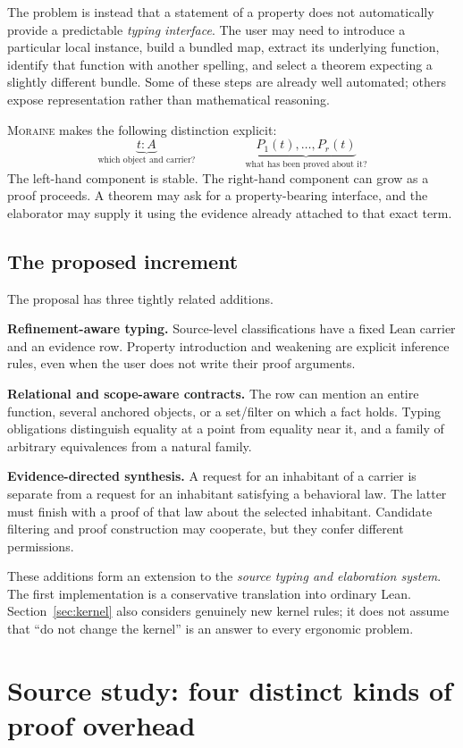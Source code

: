 \documentclass[11pt,letterpaper]{article}
\newcommand{\moraine}{\textsc{Moraine}}
\theoremstyle{definition}
\theoremstyle{remark}
\begin{document}
The problem is instead that a statement of a property does not automatically
provide a predictable \emph{typing interface}. The user may need to introduce a
particular local instance, build a bundled map, extract its underlying function,
identify that function with another spelling, and select a theorem expecting a
slightly different bundle. Some of these steps are already well automated;
others expose representation rather than mathematical reasoning.

\moraine{} makes the following distinction explicit:
\[
\underbrace{t:A}_{\text{which object and carrier?}}
\qquad\qquad
\underbrace{P_1(t),\ldots,P_r(t)}_{\text{what has been proved about it?}}
\]
The left-hand component is stable. The right-hand component can grow as a proof
proceeds. A theorem may ask for a property-bearing interface, and the elaborator
may supply it using the evidence already attached to that exact term.

\subsection{The proposed increment}
The proposal has three tightly related additions.

\textbf{Refinement-aware typing.} Source-level classifications have a fixed Lean
carrier and an evidence row. Property introduction and weakening are explicit
inference rules, even when the user does not write their proof arguments.

\textbf{Relational and scope-aware contracts.} The row can mention an entire
function, several anchored objects, or a set/filter on which a fact holds.
Typing obligations distinguish equality at a point from equality near it, and a
family of arbitrary equivalences from a natural family.

\textbf{Evidence-directed synthesis.} A request for an inhabitant of a carrier is
separate from a request for an inhabitant satisfying a behavioral law. The latter
must finish with a proof of that law about the selected inhabitant. Candidate
filtering and proof construction may cooperate, but they confer different
permissions.

These additions form an extension to the \emph{source typing and elaboration
system}. The first implementation is a conservative translation into ordinary
Lean. Section~\ref{sec:kernel} also considers genuinely new kernel rules; it does
not assume that ``do not change the kernel'' is an answer to every ergonomic
problem.

\section{Source study: four distinct kinds of proof overhead}\label{sec:sources}
\end{document}
